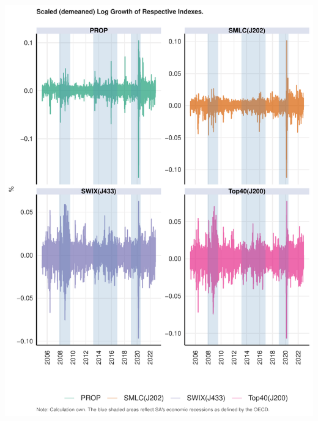 \documentclass[11pt,preprint, authoryear]{elsarticle}
\let\origfigure\figure
\let\endorigfigure\endfigure
\renewenvironment{figure}[1][2] {
    \expandafter\origfigure\expandafter[H]
} {
    \endorigfigure
}
\numberwithin{equation}{section}
\numberwithin{figure}{section}
\numberwithin{table}{section}
\begin{document}
\begin{figure}[H]

{\centering \includegraphics{19025831_files/figure-latex/aa1-1} 

}

\caption{Scaled Growth\label{aa1}}\label{fig:aa1}
\end{figure}
\end{document}
